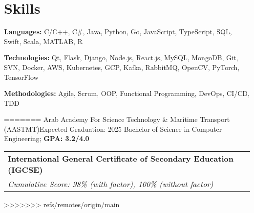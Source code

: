 \documentclass[letterpaper,11pt]{article}
\makeatletter
\newcommand{\resumeSubheading}[4]{\vspace{-2pt}\item
    \begin{tabular*}{0.97\textwidth}[t]{l@{\extracolsep{\fill}}r}
      \textbf{#1} & #2 \\
      \textit{\small#3} & \textit{\small #4} \\
    \end{tabular*}\vspace{-7pt}
}
\makeatother
\begin{document}
  \resumeSubHeadingListEnd




\section{Skills}
  \vspace{2pt}
  \resumeSubHeadingListStart
    \small{\item{
        
        \textbf{Languages:}{ C/C++, C\#, Java, Python, Go, JavaScript, TypeScript, SQL, Swift, Scala, MATLAB, R} \\ \vspace{3pt}
        
        \textbf{Technologies:}{ Qt, Flask, Django, Node.js, React.js, MySQL, MongoDB, Git, SVN, Docker, AWS, Kubernetes, GCP, Kafka, RabbitMQ, OpenCV, PyTorch, TensorFlow} \\ \vspace{3pt}
        
        \textbf{Methodologies:}{ Agile, Scrum, OOP, Functional Programming, DevOps, CI/CD, TDD} \\ \vspace{3pt}
        
    }}
  \resumeSubHeadingListEnd



=======
      {Arab Academy For Science Technology \& Maritime Transport (AASTMT)}{Expected Graduation: 2025}
      {Bachelor of Science in Computer Engineering; \textbf{GPA: 3.2/4.0}}{}{}{}
    \resumeSubheading
      {International General Certificate of Secondary Education (IGCSE)}{}
      {Cumulative Score: 98\% (with factor), 100\% (without factor)}{}{}
\resumeSubHeadingListEnd
>>>>>>> refs/remotes/origin/main

\end{document}
